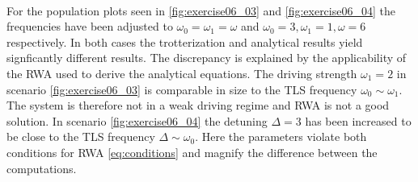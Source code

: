\\
For the population plots seen in \ref{fig:exercise06_03} and \ref{fig:exercise06_04} the frequencies have been adjusted to $\omega_0 = \omega_1 = \omega$ and $\omega_0 = 3, \omega_1 = 1, \omega = 6$ respectively. In both cases the trotterization and analytical results yield signficantly different results. The discrepancy is explained by the applicability of the RWA used to derive the analytical equations. The driving strength $\omega_1 = 2$ in scenario \ref{fig:exercise06_03} is comparable in size to the TLS frequency $\omega_0 \sim \omega_1$. The system is therefore not in a weak driving regime and RWA is not a good solution. In scenario \ref{fig:exercise06_04} the detuning $\Delta = 3$ has been increased to be close to the TLS frequency $\Delta \sim \omega_0$. Here the parameters violate both conditions for RWA \eqref{eq:conditions} and magnify the difference between the computations.
